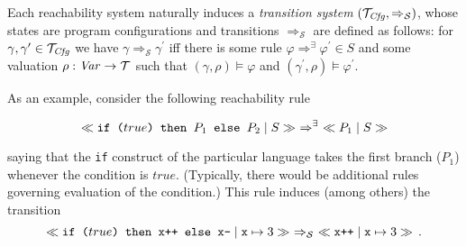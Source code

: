 Each reachability system naturally induces a \emph{transition system}
$(\mathcal{T}_{\mathit{Cfg}} , \Rightarrow_{\mathcal{S}})$, whose states are program configurations
and transitions $\Rightarrow_{\mathcal{S}}$ are defined as follows: for
$\gamma, \gamma^\prime \in \mathcal{T}_{\mathit{Cfg}}$ we have
$\gamma \Rightarrow_{\mathcal{S}} \gamma^\prime$ iff there is some rule
$\varphi \Rightarrow^\exists \varphi^\prime \in S$ and some valuation
$\rho : \mathit{Var} \to \mathcal{T}$ such that $(\gamma, \rho) \vDash \varphi$ and
$(\gamma^\prime , \rho) \vDash \varphi^\prime$.

As an example, consider the following reachability rule

\begin{equation}\label{eqn:ruleIfTrue}
    \tap{if ($true$) then $P_1$ else $P_2$}{S} \ \Rightarrow^{\exists}\ \tap{$P_1$}{S}
\end{equation}

saying that the \texttt{if} construct of the particular language takes the first branch ($P_1$)
whenever the condition is $\mathit{true}$. (Typically, there would be additional rules governing evaluation of the condition.)
%
This rule induces (among others) the transition
\begin{equation}\label{eqn:ruleIfTrue}
  \ll\texttt{if ($true$) then x++ else x--}\mid \mathtt{x}\mapsto 3\gg\
  \Rightarrow_{\mathcal{S}}\  \ll\texttt{x++}\mid \mathtt{x}\mapsto 3\gg \,.
\end{equation}






